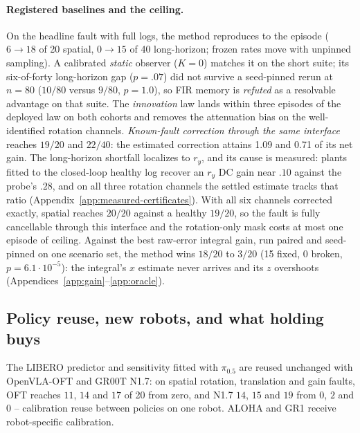 \paragraph{Registered baselines and the ceiling.}
On the headline fault with full logs, the method reproduces to the episode
($6\to18$ of 20 spatial, $0\to15$ of 40 long-horizon; frozen rates move with
unpinned sampling). A calibrated \emph{static} observer ($K=0$) matches it on the short suite;
its six-of-forty long-horizon gap ($p=.07$) did not survive a seed-pinned
rerun at $n=80$ ($10/80$ versus $9/80$, $p=1.0$), so FIR memory is
\emph{refuted} as a resolvable advantage on that suite. The \emph{innovation} law lands
within three episodes of the deployed law on both cohorts and removes the
attenuation bias on the well-identified rotation channels.
\emph{Known-fault correction through the same interface} reaches $19/20$
and $22/40$: the estimated correction attains 1.09 and 0.71 of its net gain. The long-horizon shortfall localizes to $r_y$, and its cause is measured:
plants fitted to the closed-loop healthy log recover an $r_y$ DC gain near
$.10$ against the probe's $.28$, and on all three rotation channels the
settled estimate tracks that ratio
(Appendix~\ref{app:measured-certificates}). With all six channels corrected exactly,
spatial reaches $20/20$ against a healthy $19/20$, so the fault is fully
cancellable through this interface and the rotation-only mask costs at most
one episode of ceiling. Against the best raw-error integral gain, run paired and seed-pinned on one
scenario set, the method wins $18/20$ to $3/20$ (15 fixed, 0 broken,
$p=6.1\cdot10^{-5}$): the integral's $x$ estimate never arrives and its $z$
overshoots (Appendices~\ref{app:gain}--\ref{app:oracle}).

\subsection{Policy reuse, new robots, and what holding buys}
The LIBERO predictor and sensitivity fitted with $\pi_{0.5}$ are reused
unchanged with OpenVLA-OFT and GR00T N1.7: on spatial rotation, translation
and gain faults, OFT reaches $11$, $14$ and $17$ of 20 from zero, and N1.7
$14$, $15$ and $19$ from $0$, $2$ and $0$ -- calibration reuse between
policies on one robot. ALOHA and GR1 receive robot-specific calibration.

